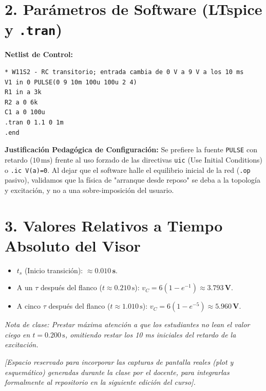 \documentclass[11pt, a4paper]{article}
\begin{document}
\section*{2. Parámetros de Software (LTspice y \texttt{.tran})}
\textbf{Netlist de Control:}
\begin{verbatim}
* W11S2 - RC transitorio; entrada cambia de 0 V a 9 V a los 10 ms
V1 in 0 PULSE(0 9 10m 100u 100u 2 4)
R1 in a 3k
R2 a 0 6k
C1 a 0 100u
.tran 0 1.1 0 1m
.end
\end{verbatim}

\textbf{Justificación Pedagógica de Configuración:}
Se prefiere la fuente \texttt{PULSE} con retardo ($10\,\text{ms}$) frente al uso forzado de las directivas \texttt{uic} (Use Initial Conditions) o \texttt{.ic V(a)=0}. Al dejar que el software halle el equilibrio inicial de la red (\texttt{.op} pasivo), validamos que la física de "arranque desde reposo" se deba a la topología y excitación, y no a una sobre-imposición del usuario.

\section*{3. Valores Relativos a Tiempo Absoluto del Visor}
\begin{itemize}
    \item $t_s$ (Inicio transición): $\approx \mathbf{0.010\,\text{s}}$.
    \item A un $\tau$ después del flanco ($t \approx 0.210\,\text{s}$): $v_C = 6(1 - e^{-1}) \approx \mathbf{3.793\,\text{V}}$.
    \item A cinco $\tau$ después del flanco ($t \approx 1.010\,\text{s}$): $v_C = 6(1 - e^{-5}) \approx \mathbf{5.960\,\text{V}}$.
\end{itemize}
\textit{Nota de clase: Prestar máxima atención a que los estudiantes no lean el valor ciego en $t=0.200\,\text{s}$, omitiendo restar los 10 ms iniciales del retardo de la excitación.}

\vspace{0.5cm}
\begin{tcolorbox}[colback=white, colframe=black, title=\textbf{Inserción Posterior de Evidencia Visual}]
\textit{[Espacio reservado para incorporar las capturas de pantalla reales (plot y esquemático) generadas durante la clase por el docente, para integrarlas formalmente al repositorio en la siguiente edición del curso].}
\vspace{4cm}
\end{tcolorbox}
\end{document}
